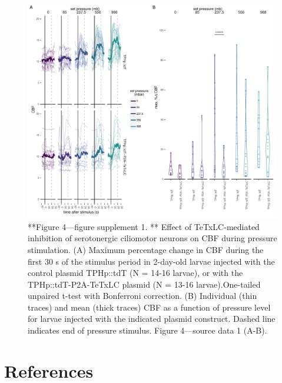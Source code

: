 \documentclass[
]{article}
\begin{document}
\begin{figure}
\includegraphics[width=34.72in]{Figures/Figure4-FigureSupplement1} \caption{**Figure 4—figure supplement 1. ** Effect of TeTxLC-mediated inhibition of serotonergic ciliomotor neurons on CBF during pressure stimulation. (A) Maximum percentage change in CBF during the first 30 s of the stimulus period in 2-day-old larvae injected with the control plasmid TPHp::tdT (N = 14-16 larvae), or with the TPHp::tdT-P2A-TeTxLC plasmid (N = 13-16 larvae).One-tailed unpaired t-test with Bonferroni correction. (B)  Individual (thin traces) and mean (thick traces) CBF as a function of pressure level for larvae injected with the indicated plasmid construct. Dashed line indicates end of pressure stimulus. Figure 4---source data 1 (A-B). }\label{fig:unnamed-chunk-15}
\end{figure}

\hypertarget{references}{%
\section*{References}\label{references}}
\end{document}
